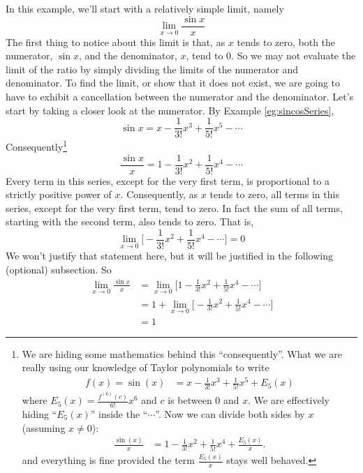 \begin{eg}\label{eg:TaylorlimitA}
In this example, we'll start with a relatively simple limit, namely
\begin{equation*}
\lim_{x\rightarrow 0}\frac{\sin x}{x}
\end{equation*}
The first thing to notice about this limit is that, as $x$ tends to zero,
both the numerator, $\sin x$, and the denominator, $x$, tend to $0$.
So we may not evaluate the limit of the ratio by simply dividing
the limits of the numerator and denominator.
To find the limit, or show that it does not exist,
we are going to have to exhibit a cancellation between the numerator and
the denominator. Let's start by taking a closer look at
the numerator. By Example \ref{eg:sincosSeries},
\begin{equation*}
\sin x = x-\frac{1}{3!}x^3+\frac{1}{5!}x^5 - \cdots
\end{equation*}
Consequently\footnote{We are hiding some mathematics behind this ``consequently''. What we are really using
our knowledge of Taylor polynomials to write
\begin{align*}
  f(x) = \sin(x) &= x-\frac{1}{3!}x^3+\frac{1}{5!}x^5 + E_5(x)
\end{align*}
where $E_5(x) = \frac{f^{(6)}(c)}{6!} x^6$ and $c$ is between 0 and $x$. We are effectively hiding ``$E_5(x)$'' inside
the ``$\cdots$''. Now we can divide both sides by $x$ (assuming $x \neq 0$):
\begin{align*}
\frac{\sin(x)}{x} &= 1-\frac{1}{3!}x^2+\frac{1}{5!}x^4 + \frac{E_5(x)}{x}.
\end{align*}
and everything is fine provided the term $\frac{E_5(x)}{x}$ stays well behaved.
}
\begin{equation*}
\frac{\sin x}{x}=1-\frac{1}{3!}x^2 + \frac{1}{5!}x^4 - \cdots
\end{equation*}
Every term in this series, except for the very first term, is
proportional to a strictly positive power of $x$.
Consequently, as $x$ tends to zero, all terms in this series, except for the
very first term, tend to zero. In fact the sum of all terms,
starting with the second term, also tends to zero. That is,
\begin{equation*}
\lim_{x\rightarrow 0}\Big[-\frac{1}{3!}x^2 + \frac{1}{5!}x^4 - \cdots\Big]
=0
\end{equation*}
We won't justify that statement here, but it will be justified
in the following (optional) subsection. So
\begin{align*}
\lim_{x\rightarrow 0}\frac{\sin x}{x}
& =\lim_{x\rightarrow 0}\Big[1-\frac{1}{3!}x^2 + \frac{1}{5!}x^4 - \cdots\Big]
\\
&=1+\lim_{x\rightarrow 0}\Big[-\frac{1}{3!}x^2 + \frac{1}{5!}x^4 - \cdots\Big]
\\
&=1
\end{align*}
\end{eg}


